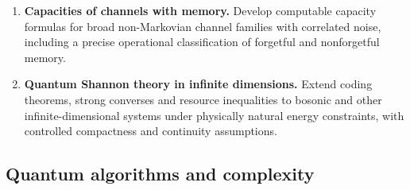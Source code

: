 \documentclass{article}
\begin{document}
\begin{enumerate}[label=\textbf{C\arabic*.},leftmargin=*]
\item \precise{} \textbf{Capacities of channels with memory.}
Develop computable capacity formulas for broad non-Markovian channel
families with correlated noise, including a precise operational
classification of forgetful and nonforgetful memory.

\item \formalism{} \textbf{Quantum Shannon theory in infinite dimensions.}
Extend coding theorems, strong converses and resource inequalities to
bosonic and other infinite-dimensional systems under physically
natural energy constraints, with controlled compactness and continuity
assumptions.

\end{enumerate}


\subsection{Quantum algorithms and complexity}
\end{document}
